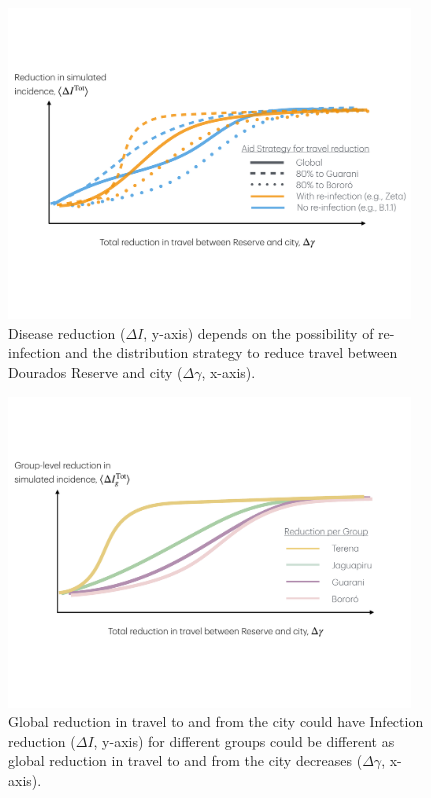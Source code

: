 \documentclass[
  letterpaper,
  abstract]{scrartcl}
\begin{document}
\begin{figure}[H]

\caption{Disease reduction ($\Delta I$, y-axis) depends on the possibility of
  re-infection and the
distribution strategy to reduce travel between Dourados Reserve and city ($\Delta \gamma$, x-axis).}
\label{fig:ByReinfectionByStrategy}
\vspace{0.3em}
{\centering
  \includegraphics[width=0.95\textwidth,height=\textheight]{Figures/ResultsSketch_ByReinfectionByStrategy.pdf}

}


\end{figure}%

\begin{figure}[H]

\caption{Global reduction in travel to and from the city could have
Infection reduction ($\Delta I$, y-axis) for different groups could be
different as global reduction in travel to and from the city decreases
($\Delta \gamma$, x-axis).}
\label{fig:ByGroupReduction_GlobalStrategy}
\vspace{0.3em}
{\centering \includegraphics[width=0.95\textwidth,height=\textheight]{Figures/ResultsSketch_ReductionByGroup.pdf}

}

\end{figure}%
\end{document}
